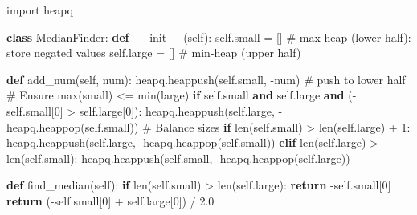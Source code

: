 \documentclass[11pt]{article}
\newenvironment{Shaded}{\begin{snugshade}}{\end{snugshade}}
\newcommand{\BuiltInTok}[1]{\textcolor[rgb]{0.50,0.55,0.55}{#1}}
\newcommand{\CommentTok}[1]{\textcolor[rgb]{0.48,0.49,0.49}{#1}}
\newcommand{\ControlFlowTok}[1]{\textcolor[rgb]{0.99,0.74,0.29}{\textbf{#1}}}
\newcommand{\DecValTok}[1]{\textcolor[rgb]{0.96,0.45,0.00}{#1}}
\newcommand{\FloatTok}[1]{\textcolor[rgb]{0.96,0.45,0.00}{#1}}
\newcommand{\FunctionTok}[1]{\textcolor[rgb]{0.56,0.27,0.68}{#1}}
\newcommand{\ImportTok}[1]{\textcolor[rgb]{0.15,0.68,0.38}{#1}}
\newcommand{\KeywordTok}[1]{\textcolor[rgb]{0.81,0.81,0.76}{\textbf{#1}}}
\newcommand{\NormalTok}[1]{\textcolor[rgb]{0.81,0.81,0.76}{#1}}
\newcommand{\OperatorTok}[1]{\textcolor[rgb]{0.81,0.81,0.76}{#1}}
\newcommand{\VariableTok}[1]{\textcolor[rgb]{0.15,0.68,0.68}{#1}}
\begin{document}
\begin{Shaded}
\begin{Highlighting}[]
\ImportTok{import}\NormalTok{ heapq}

\KeywordTok{class}\NormalTok{ MedianFinder:}
    \KeywordTok{def} \FunctionTok{\_\_init\_\_}\NormalTok{(}\VariableTok{self}\NormalTok{):}
        \VariableTok{self}\NormalTok{.small }\OperatorTok{=}\NormalTok{ []   }\CommentTok{\# max{-}heap (lower half): store negated values}
        \VariableTok{self}\NormalTok{.large }\OperatorTok{=}\NormalTok{ []   }\CommentTok{\# min{-}heap (upper half)}

    \KeywordTok{def}\NormalTok{ add\_num(}\VariableTok{self}\NormalTok{, num):}
\NormalTok{        heapq.heappush(}\VariableTok{self}\NormalTok{.small, }\OperatorTok{{-}}\NormalTok{num)          }\CommentTok{\# push to lower half}
        \CommentTok{\# Ensure max(small) \textless{}= min(large)}
        \ControlFlowTok{if} \VariableTok{self}\NormalTok{.small }\KeywordTok{and} \VariableTok{self}\NormalTok{.large }\KeywordTok{and}\NormalTok{ (}\OperatorTok{{-}}\VariableTok{self}\NormalTok{.small[}\DecValTok{0}\NormalTok{] }\OperatorTok{\textgreater{}} \VariableTok{self}\NormalTok{.large[}\DecValTok{0}\NormalTok{]):}
\NormalTok{            heapq.heappush(}\VariableTok{self}\NormalTok{.large, }\OperatorTok{{-}}\NormalTok{heapq.heappop(}\VariableTok{self}\NormalTok{.small))}
        \CommentTok{\# Balance sizes}
        \ControlFlowTok{if} \BuiltInTok{len}\NormalTok{(}\VariableTok{self}\NormalTok{.small) }\OperatorTok{\textgreater{}} \BuiltInTok{len}\NormalTok{(}\VariableTok{self}\NormalTok{.large) }\OperatorTok{+} \DecValTok{1}\NormalTok{:}
\NormalTok{            heapq.heappush(}\VariableTok{self}\NormalTok{.large, }\OperatorTok{{-}}\NormalTok{heapq.heappop(}\VariableTok{self}\NormalTok{.small))}
        \ControlFlowTok{elif} \BuiltInTok{len}\NormalTok{(}\VariableTok{self}\NormalTok{.large) }\OperatorTok{\textgreater{}} \BuiltInTok{len}\NormalTok{(}\VariableTok{self}\NormalTok{.small):}
\NormalTok{            heapq.heappush(}\VariableTok{self}\NormalTok{.small, }\OperatorTok{{-}}\NormalTok{heapq.heappop(}\VariableTok{self}\NormalTok{.large))}

    \KeywordTok{def}\NormalTok{ find\_median(}\VariableTok{self}\NormalTok{):}
        \ControlFlowTok{if} \BuiltInTok{len}\NormalTok{(}\VariableTok{self}\NormalTok{.small) }\OperatorTok{\textgreater{}} \BuiltInTok{len}\NormalTok{(}\VariableTok{self}\NormalTok{.large):}
            \ControlFlowTok{return} \OperatorTok{{-}}\VariableTok{self}\NormalTok{.small[}\DecValTok{0}\NormalTok{]}
        \ControlFlowTok{return}\NormalTok{ (}\OperatorTok{{-}}\VariableTok{self}\NormalTok{.small[}\DecValTok{0}\NormalTok{] }\OperatorTok{+} \VariableTok{self}\NormalTok{.large[}\DecValTok{0}\NormalTok{]) }\OperatorTok{/} \FloatTok{2.0}
\end{Highlighting}
\end{Shaded}
\end{document}
